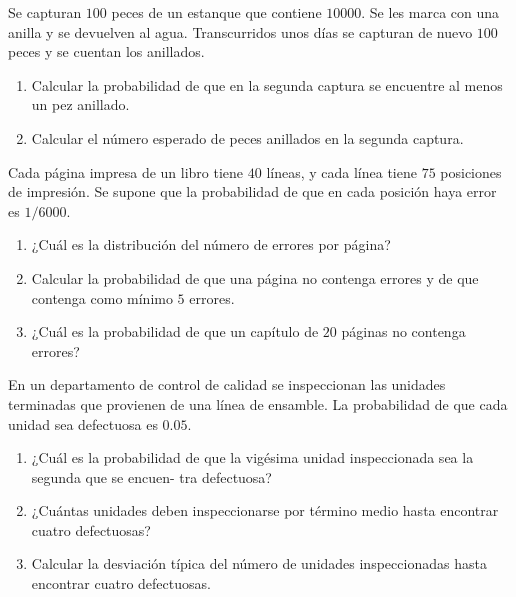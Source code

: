 \begin{ejercicio}
    Se capturan $100$ peces de un estanque que contiene $10000$. Se les marca con una anilla y se
    devuelven al agua. Transcurridos unos días se capturan de nuevo $100$ peces y se cuentan los
    anillados.
    \begin{enumerate}
        \item Calcular la probabilidad de que en la segunda captura se encuentre al menos un pez anillado.
        \item Calcular el número esperado de peces anillados en la segunda captura.
    \end{enumerate}



\end{ejercicio}

\begin{ejercicio}
    Cada página impresa de un libro tiene $40$ líneas, y cada línea tiene $75$ posiciones de impresión. Se
    supone que la probabilidad de que en cada posición haya error es $1/6000$.
    \begin{enumerate}
        \item ¿Cuál es la distribución del número de errores por página?
        \item Calcular la probabilidad de que una página no contenga errores y de que contenga como mínimo
        $5$ errores.
        \item ¿Cuál es la probabilidad de que un capítulo de $20$ páginas no contenga errores?
    \end{enumerate}
\end{ejercicio}

\begin{ejercicio}
    En un departamento de control de calidad se inspeccionan las unidades terminadas que provienen
    de una línea de ensamble. La probabilidad de que cada unidad sea defectuosa es $0.05$.
    \begin{enumerate}
        \item ¿Cuál es la probabilidad de que la vigésima unidad inspeccionada sea la segunda que se encuen-
        tra defectuosa?
        \item ¿Cuántas unidades deben inspeccionarse por término medio hasta encontrar cuatro defectuosas?
        \item Calcular la desviación típica del número de unidades inspeccionadas hasta encontrar cuatro
        defectuosas.
    \end{enumerate}



\end{ejercicio}


